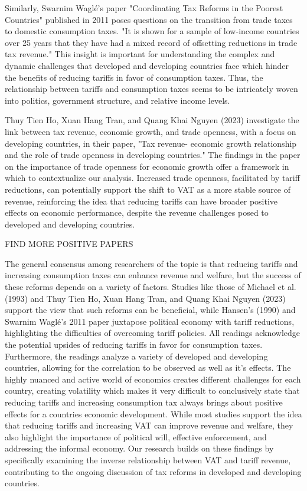 \documentclass[12pt]{article}
\begin{document}
Similarly, Swarnim Waglé's paper "Coordinating Tax Reforms in the Poorest Countries" published in 2011 poses questions on the transition from trade taxes to domestic consumption taxes. "It is
shown for a sample of low-income countries over 25 years that they have had a mixed record of offsetting reductions in trade tax revenue." This insight is important for understanding the complex and dynamic challenges that developed and developing countries face which hinder the benefits of reducing tariffs in favor of consumption taxes. Thus, the relationship between tariffs and consumption taxes seems to be intricately woven into politics, government structure, and relative income levels. 

Thuy Tien Ho, Xuan Hang Tran, and Quang Khai Nguyen (2023) investigate the link between tax revenue, economic growth, and trade openness, with a focus on developing countries, in their paper, "Tax revenue- economic growth relationship and the role of trade openness in developing countries."  The findings in the paper on the importance of trade openness for economic growth offer a framework in which to contextualize our analysis. Increased trade openness, facilitated by tariff reductions, can potentially support the shift to VAT as a more stable source of revenue, reinforcing the idea that reducing tariffs can have broader positive effects on economic performance, despite the revenue challenges posed to developed and developing countries. 

FIND MORE POSITIVE PAPERS

The general consensus among researchers of the topic is that reducing tariffs and increasing consumption taxes can enhance revenue and welfare, but the success of these reforms depends on a variety of factors. Studies like those of Michael et al. (1993) and Thuy Tien Ho, Xuan Hang Tran, and Quang Khai Nguyen (2023) support the view that such reforms can be beneficial, while Hansen’s (1990) and Swarnim Waglé's 2011 paper juxtapose political economy with tariff reductions, highlighting the difficulties of overcoming tariff policies. All readings acknowledge the potential upsides of reducing tariffs in favor for consumption taxes. Furthermore, the readings analyze a variety of developed and developing countries, allowing for the correlation to be observed as well as it's effects. The highly nuanced and active world of economics creates different challenges for each country, creating volatility which makes it very difficult to conclusively state that reducing tariffs and increasing consumption tax always brings about positive effects for a countries economic development. While most studies support the idea that reducing tariffs and increasing VAT can improve revenue and welfare, they also highlight the importance of political will, effective enforcement, and addressing the informal economy. Our research builds on these findings by specifically examining the inverse relationship between VAT and tariff revenue, contributing to the ongoing discussion of tax reforms in developed and developing countries.
\end{document}
